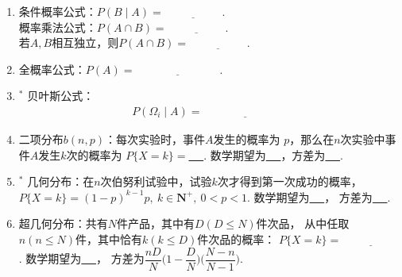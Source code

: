\documentclass{article}
\newif\ifte
\renewcommand\leq\leqslant
\begin{document}
\begin{multicols}{2}
\begin{enumerate}[leftmargin=20pt]
\item 条件概率公式：$ P(B\mid A)=\underline{\ \ifte 
\dfrac{P(A\cap B)}{P(A)}\else \hspace{2cm} \fi\ } $. \\
概率乘法公式：$  P(A\cap B)=\underline{\ \ifte 
    P(A)P(B|A) \else \hspace{2cm} \fi\ } $. \\
若$ A,B $相互独立，则$ P(A\cap B)=\underline{\ \ifte 
    P(A)P(B) \else \hspace{2cm} \fi\ } $.

\item 全概率公式：$ P(A)=\underline{\ \ifte 
\sum\limits_{k=1}^{n} P(A \mid \varOmega_{k}) P(\varOmega_{k})
\else \hspace{3cm} \fi\ } $.

\item $^*$ 贝叶斯公式：
\begin{gather*}
    P(\varOmega_{i} \mid A)=\underline{\ \ifte 
    \dfrac{P(A \mid \varOmega_{i}) 
    P(\varOmega_{i})}{\sum\limits_{k=1}^{n} P(A \mid 
    \varOmega_{k}) P(\varOmega_{k})} \else \hspace{3cm} \fi\ }
\end{gather*}

\item 二项分布$ b(n,p) $：每次实验时，事件$ A $发生的概率为
$ p $，那么在$ n $次实验中事件$ A $发生$ k $次的概率为
$ P\{X=k\}= $\underline{\ \ifte $ C_n^kp^k(1-p)^{n-k} $
    \else \hspace{2cm} \fi\ }. 数学期望为\underline{\ \ifte 
$ np $ \else \hspace{1cm} \fi\ }，方差为\underline{\ \ifte 
$ np(1-p) $ \else \hspace{2cm} \fi\ }. 

\item $^*$ 几何分布：在$ n $次伯努利试验中，试验$ k $次才得到第一次成功的概率，$ P\{X=k\}=(1-p)^{k-1}p ,\ k\in \textbf{N}^+,\ 0<p<1 $. 
数学期望为\underline{\ \ifte $ \dfrac{1}{p} $\else \hspace{1cm} \fi\ }，
方差为\underline{\ \ifte $ \dfrac{1-p}{p^2} $\else \hspace{2cm} \fi\ }. 

\item 超几何分布：共有$ N $件产品，其中有$ D (D\leq N) $件次品，
从中任取$ n(n\leq N)$件，其中恰有$ k(k\leq D) $件次品的概率：
$ P\{X=k\}=\underline{\ \ifte \dfrac{C_D^kC_{N-D}^{n-k}}{C_N^n}
\else \hspace{2cm} \fi\ } $. 数学期望为\underline{\ \ifte 
$ \dfrac{nD}{N} $\else \hspace{1cm} \fi\ }，
方差为$ \dfrac{nD}{N}\Big(1-\dfrac{D}{N}
\Big)\Big(\dfrac{N-n}{N-1}\Big) $.


\end{enumerate}
\end{multicols}
\end{document}

